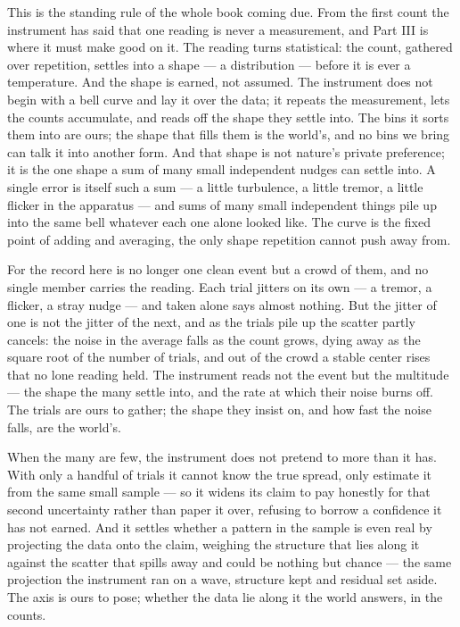 This is the standing rule of the whole book coming due. From the first count the instrument has said that one
reading is never a measurement, and Part III is where it must make good on it. The reading turns statistical:
the count, gathered over repetition, settles into a shape --- a distribution --- before it is ever a
temperature. And the shape is earned, not assumed. The instrument does not begin with a bell curve and lay it
over the data; it repeats the measurement, lets the counts accumulate, and reads off the shape they settle
into. The bins it sorts them into are ours; the shape that fills them is the world's, and no bins we bring can
talk it into another form. And that shape is not nature's private preference; it is the one shape a sum of many
small independent nudges can settle into. A single error is itself such a sum --- a little turbulence, a little
tremor, a little flicker in the apparatus --- and sums of many small independent things pile up into the same
bell whatever each one alone looked like. The curve is the fixed point of adding and averaging, the only shape
repetition cannot push away from.

For the record here is no longer one clean event but a crowd of them, and no single member carries the reading.
Each trial jitters on its own --- a tremor, a flicker, a stray nudge --- and taken alone says almost nothing.
But the jitter of one is not the jitter of the next, and as the trials pile up the scatter partly cancels: the
noise in the average falls as the count grows, dying away as the square root of the number of trials, and out
of the crowd a stable center rises that no lone reading held. The instrument reads not the event but the
multitude --- the shape the many settle into, and the rate at which their noise burns off. The trials are ours
to gather; the shape they insist on, and how fast the noise falls, are the world's.

When the many are few, the instrument does not pretend to more than it has. With only a handful of trials it
cannot know the true spread, only estimate it from the same small sample --- so it widens its claim to pay
honestly for that second uncertainty rather than paper it over, refusing to borrow a confidence it has not
earned. And it settles whether a pattern in the sample is even real by projecting the data onto the claim,
weighing the structure that lies along it against the scatter that spills away and could be nothing but chance
--- the same projection the instrument ran on a wave, structure kept and residual set aside. The axis is ours
to pose; whether the data lie along it the world answers, in the counts.


